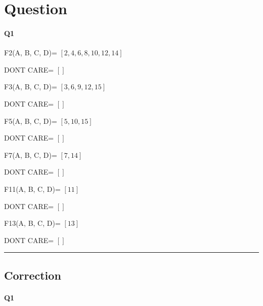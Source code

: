 
\section{Question}


\paragraph{Q1}


F2(A, B, C, D)= $[2, 4, 6, 8, 10, 12, 14]$

DONT CARE= $[]$

F3(A, B, C, D)= $[3, 6, 9, 12, 15]$

DONT CARE= $[]$

F5(A, B, C, D)= $[5, 10, 15]$

DONT CARE= $[]$

F7(A, B, C, D)= $[7, 14]$

DONT CARE= $[]$

F11(A, B, C, D)= $[11]$

DONT CARE= $[]$

F13(A, B, C, D)= $[13]$

DONT CARE= $[]$




\hrule width 1\linewidth
\pagebreak

\subsection{Correction}


\paragraph{Q1}

